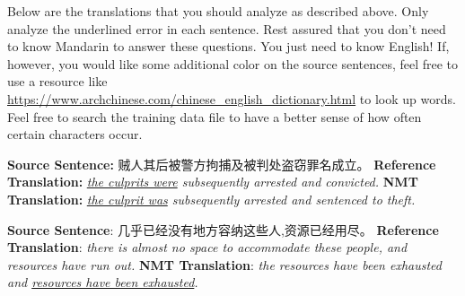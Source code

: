 \begin{parts}
    Below are the translations that you should analyze as described above. Only analyze the underlined error in each sentence. Rest assured that you don't need to know Mandarin to answer these questions. You just need to know English! If, however, you would like some additional color on the source sentences, feel free to use a resource like \url{https://www.archchinese.com/chinese_english_dictionary.html} to look up words. Feel free to search the training data file to have a better sense of how often certain characters occur.

    \begin{subparts}
        \subpart[2]
        \textbf{Source Sentence:} 贼人其后被警方拘捕及被判处盗窃罪名成立。 \newline
        \textbf{Reference Translation:} \textit{\underline{the culprits were} subsequently arrested and convicted.}\newline
        \textbf{NMT Translation:} \textit{\underline{the culprit was} subsequently arrested and sentenced to theft.}

        
        

        \subpart[2]
        \textbf{Source Sentence}: 几乎已经没有地方容纳这些人,资源已经用尽。\newline
        \textbf{Reference Translation}: \textit{there is almost no space to accommodate these people, and resources have run out.   }\newline
        \textbf{NMT Translation}: \textit{the resources have been exhausted and \underline{resources have been exhausted}.}


\end{subparts}
\end{parts}

